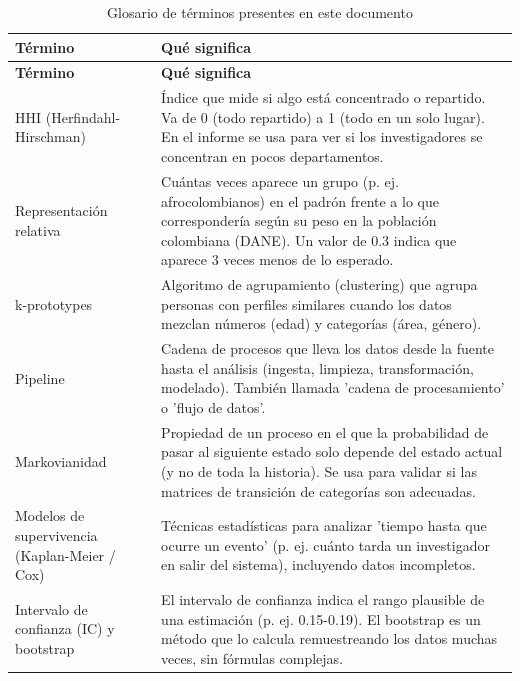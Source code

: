 \begingroup
\small
\setlength{\tabcolsep}{3pt}
\begin{longtable}{>{\raggedright\arraybackslash}p{4.3cm}>{\raggedright\arraybackslash}p{9.8cm}}
\caption{Glosario de términos presentes en este documento}
\label{tab:glosario}\\
\toprule
\textbf{Término} & \textbf{Qué significa} \\
\midrule
\endfirsthead
\toprule
\textbf{Término} & \textbf{Qué significa} \\
\midrule
\endhead
    HHI (Herfindahl-Hirschman) & Índice que mide si algo está concentrado o repartido. Va de 0 (todo repartido) a 1 (todo en un solo lugar). En el informe se usa para ver si los investigadores se concentran en pocos departamentos.
 \\
    Representación relativa & Cuántas veces aparece un grupo (p. ej. afrocolombianos) en el padrón frente a lo que correspondería según su peso en la población colombiana (DANE). Un valor de 0.3 indica que aparece 3 veces menos de lo esperado.
 \\
    k-prototypes & Algoritmo de agrupamiento (clustering) que agrupa personas con perfiles similares cuando los datos mezclan números (edad) y categorías (área, género).
 \\
    Pipeline & Cadena de procesos que lleva los datos desde la fuente hasta el análisis (ingesta, limpieza, transformación, modelado). También llamada 'cadena de procesamiento' o 'flujo de datos'.
 \\
    Markovianidad & Propiedad de un proceso en el que la probabilidad de pasar al siguiente estado solo depende del estado actual (y no de toda la historia). Se usa para validar si las matrices de transición de categorías son adecuadas.
 \\
    Modelos de supervivencia (Kaplan-Meier / Cox) & Técnicas estadísticas para analizar 'tiempo hasta que ocurre un evento' (p. ej. cuánto tarda un investigador en salir del sistema), incluyendo datos incompletos.
 \\
    Intervalo de confianza (IC) y bootstrap & El intervalo de confianza indica el rango plausible de una estimación (p. ej. 0.15-0.19). El bootstrap es un método que lo calcula remuestreando los datos muchas veces, sin fórmulas complejas.
 \\
\bottomrule
\end{longtable}
\endgroup
